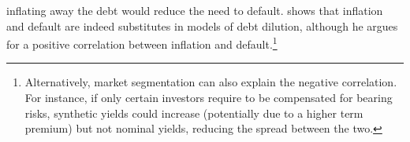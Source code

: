 {%
inflating away the debt would reduce the need to default.
\cite{Galli:2020} shows that inflation and default are indeed substitutes in models of debt dilution, although he argues for a positive correlation between inflation and default.\footnote{ Alternatively, market segmentation %
	can also explain the negative correlation. For instance, if only certain investors require to be compensated for bearing risks, synthetic yields could increase (potentially due to a higher term premium) but not nominal yields, reducing the spread between the two.}


}
